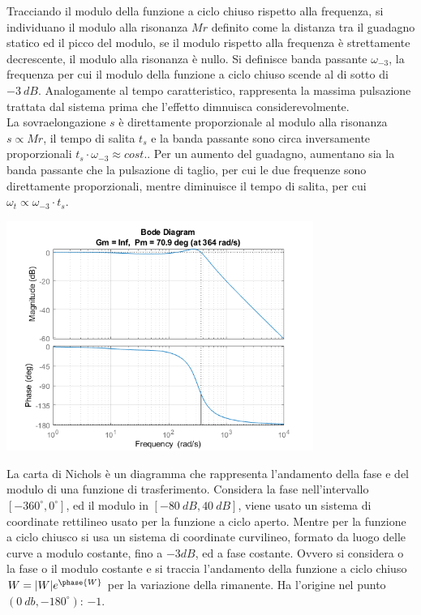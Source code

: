 \documentclass{article}
\numberwithin{equation}{subsection}
\begin{document}
Tracciando il modulo della funzione a ciclo chiuso rispetto alla frequenza, si individuano il modulo alla risonanza $Mr$ definito come la distanza tra il guadagno statico 
ed il picco del modulo, se il modulo rispetto alla frequenza è strettamente decrescente, il modulo alla risonanza è nullo. Si definisce banda passante $\omega_{-3}$, la 
frequenza per cui il modulo della funzione a ciclo chiuso scende al di sotto di $-3\:dB$. Analogamente al tempo caratteristico, rappresenta la massima pulsazione trattata dal 
sistema prima che l'effetto dimnuisca considerevolmente. \\
La sovraelongazione $s$ è direttamente proporzionale al modulo alla risonanza $s\propto Mr$, il tempo di salita $t_s$ e la banda passante sono circa inversamente proporzionali 
$t_s\cdot\omega_{-3}\approx cost.$. Per un aumento del guadagno, aumentano sia la banda passante che la pulsazione di taglio, per cui le due frequenze sono direttamente proporzionali, 
mentre diminuisce il tempo di salita, per cui $\omega_t\propto\omega_{-3}\cdot t_s$.

\begin{center}
    \includegraphics[width=10cm]{Bode3.png}
\end{center}

La carta di Nichols è un diagramma che rappresenta l'andamento della fase e del modulo di una funzione di trasferimento. Considera la fase nell'intervallo 
$[-360^{\circ},0^{\circ}]$, ed il modulo in $[-80\:dB, 40\:dB]$, viene usato un sistema di coordinate rettilineo usato per la funzione a ciclo aperto. Mentre per la funzione 
a ciclo chiusco si usa un sistema di coordinate curvilineo, formato da luogo delle curve a modulo costante, fino a $-3dB$, ed a fase costante. Ovvero si considera o la fase 
o il modulo costante e si traccia l'andamento della funzione a ciclo chiuso $W=|W|e^{\phase{W}}$ per la variazione della rimanente. Ha l'origine nel punto 
$(0\:db,-180^{\circ})$: $-1$. \\
\end{document}

